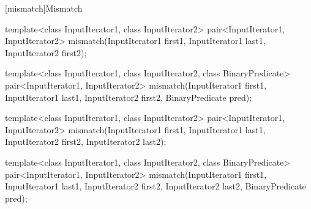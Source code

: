 [mismatch]{Mismatch}

%
\begin{removedblock}
\begin{itemdecl}
template<class InputIterator1, class InputIterator2>
  pair<InputIterator1, InputIterator2>
      mismatch(InputIterator1 first1, InputIterator1 last1,
               InputIterator2 first2);

template<class InputIterator1, class InputIterator2,
          class BinaryPredicate>
  pair<InputIterator1, InputIterator2>
      mismatch(InputIterator1 first1, InputIterator1 last1,
               InputIterator2 first2, BinaryPredicate pred);

template<class InputIterator1, class InputIterator2>
  pair<InputIterator1, InputIterator2>
    mismatch(InputIterator1 first1, InputIterator1 last1,
             InputIterator2 first2, InputIterator2 last2);

template<class InputIterator1, class InputIterator2,
           class BinaryPredicate>
  pair<InputIterator1, InputIterator2>
    mismatch(InputIterator1 first1, InputIterator1 last1,
             InputIterator2 first2, InputIterator2 last2,
             BinaryPredicate pred);
\end{itemdecl}
\end{removedblock}
